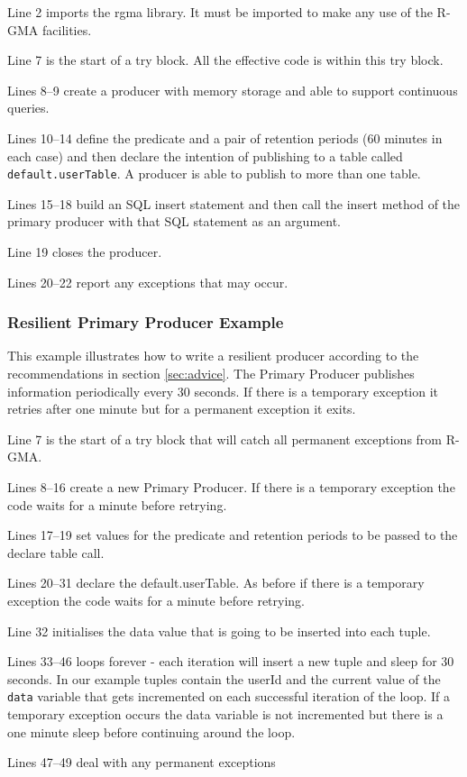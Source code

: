 Line 2 imports the rgma library. It must be imported
to make any use of the R-GMA facilities.

Line 7 is the start of a try block. All the effective code is within
this try block.

Lines 8--9 create a producer with memory storage and able to support
continuous queries.

Lines 10--14 define the predicate and a pair of retention periods (60
minutes in each case) and then declare the intention of publishing to
a table called \texttt{default.userTable}. A producer is able to
publish to more than one table.

Lines 15--18 build an SQL insert statement and then call the insert
method of the primary producer with that SQL statement as an argument.

Line 19 closes the producer.

Lines 20--22 report any exceptions that may occur.

\subsubsection{Resilient Primary Producer Example}

This example illustrates how to write a resilient producer according
to the recommendations in section \ref{sec:advice}.
The Primary Producer publishes information periodically every 30
seconds. If there is a temporary exception it retries
after one minute but for a permanent exception it exits. 



Line 7 is the start of a try block that will catch all permanent
exceptions from R-GMA.

Lines 8--16 create a new Primary Producer. If there is a temporary exception
the code waits for a minute before retrying.

Lines 17--19 set values for the predicate and retention periods to be passed to
the declare table call.

Lines 20--31 declare the default.userTable. As before if there is a temporary exception
the code waits for a minute before retrying.

Line 32 initialises the data value that is going to be inserted into
each tuple.

Lines 33--46 loops forever - each iteration will insert a new
tuple and sleep for 30 seconds. In our example tuples contain the userId and the
current value of the \texttt{data} variable that gets incremented on each successful
iteration of the loop. If a temporary exception occurs the data variable is not
incremented but there is a one minute sleep before continuing around the loop. 

Lines 47--49 deal with any permanent exceptions
